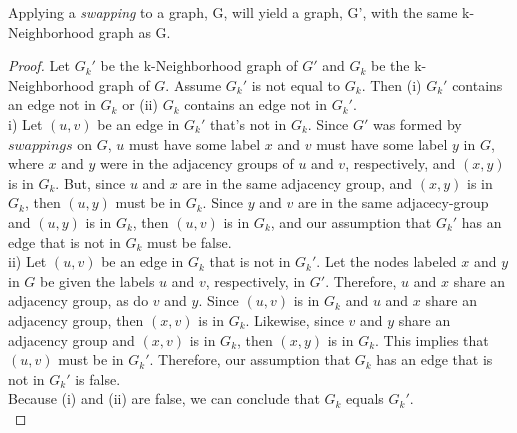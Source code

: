 \begin{thm}  Applying a \emph{swapping} to a graph, G, will yield a graph, G', with the same k-Neighborhood graph as G.
\end{thm}
\begin{proof}
\noindent Let $G_k'$ be the k-Neighborhood graph of $G'$ and $G_k$ be the k-Neighborhood graph of $G$. Assume $G_k'$ is not equal to $G_k$. Then (i) $G_k'$ contains an edge not in $G_k$ or (ii) $G_k$ contains an edge not in $G_k'$.  \\
\indent i) Let $(u,v)$ be an edge in $G_k'$ that's not in $G_k$. Since $G'$ was formed by $swappings$ on $G$, $u$ must have some label $x$ and $v$ must have some label $y$ in $G$, where $x$ and $y$ were in the adjacency groups of $u$ and $v$, respectively, and $(x,y)$ is in $G_k$. But, since $u$ and $x$ are in the same adjacency group, and $(x,y)$ is in $G_k$, then $(u,y)$ must be in $G_k$. Since $y$ and $v$ are in the same adjacecy-group and $(u,y)$ is in $G_k$, then $(u,v)$ is in $G_k$, and our assumption that $G_k'$ has an edge that is not in $G_k$ must be false.\\
\indent 			ii) Let $(u,v)$ be an edge in $G_k$ that is not in $G_k'.$ Let the nodes labeled $x$ and $y$ in $G$ be given the labels $u$ and $v$, respectively, in $G'$. Therefore, $u$ and $x$ share an adjacency group, as do $v$ and $y$.  Since $(u,v)$ is in $G_k$ and $u$ and $x$ share an adjacency group, then $(x,v)$ is in $G_k$. Likewise, since $v$ and $y$ share an adjacency group and $(x,v)$ is in $G_k$, then $(x,y)$ is in $G_k$. This implies that $(u,v)$ must be in $G_k'$. Therefore, our assumption that $G_k$ has an edge that is not in $G_k'$ is false. \\
\indent Because (i) and (ii) are false, we can conclude that $G_k$ equals $G_k'$.\\
\end{proof}
